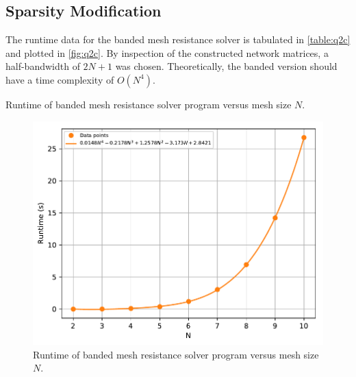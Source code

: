 \documentclass[a4paper,titlepage]{article}
\begin{document}
	\subsection{Sparsity Modification}
	
	The runtime data for the banded mesh resistance solver is tabulated in \autoref{table:q2c} and plotted in \autoref{fig:q2c}. By inspection of the constructed network matrices, a half-bandwidth of $2N + 1$ was chosen. Theoretically, the banded version should have a time complexity of $O(N^4)$.
	
	\begin{table}[!htb]
		\centering
		\caption{Runtime of banded mesh resistance solver program versus mesh size $N$.}
		\label{table:q2c}
	\end{table}

	\begin{figure}[!htb]
		\centering
		\includegraphics[width=\columnwidth]{plots/q2c.pdf}
		\caption
		{Runtime of banded mesh resistance solver program versus mesh size $N$.}
		\label{fig:q2c}
	\end{figure}

\end{document}
